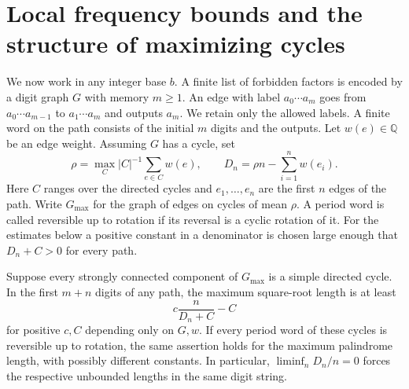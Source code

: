 \section{Local frequency bounds and the structure of maximizing cycles}
\label{sec:frequency}

We now work in any integer base \(b\). A finite list of forbidden factors is encoded by a digit graph \(G\) with memory \(m\ge1\). An edge with label \(a_0\cdots a_m\) goes from \(a_0\cdots a_{m-1}\) to \(a_1\cdots a_m\) and outputs \(a_m\). We retain only the allowed labels. A finite word on the path consists of the initial \(m\) digits and the outputs. Let \(w(e)\in\mathbb Q\) be an edge weight. Assuming \(G\) has a cycle, set
\[
  \rho=\max_C |C|^{-1}\sum_{e\in C} w(e),\qquad
  D_n=\rho n-\sum_{i=1}^{n}w(e_i).
\]
Here \(C\) ranges over the directed cycles and \(e_1,\ldots,e_n\) are the first \(n\) edges of the path. Write \(G_{\max}\) for the graph of edges on cycles of mean \(\rho\). A period word is called reversible up to rotation if its reversal is a cyclic rotation of it. For the estimates below a positive constant in a denominator is chosen large enough that \(D_n+C>0\) for every path.

\begin{theorem}\label{thm:extreme-frequency}
Suppose every strongly connected component of \(G_{\max}\) is a simple directed cycle. In the first \(m+n\) digits of any path, the maximum square-root length is at least
\[
                 c\frac{n}{D_n+C}-C
\]
for positive \(c,C\) depending only on \(G,w\). If every period word of these cycles is reversible up to rotation, the same assertion holds for the maximum palindrome length, with possibly different constants. In particular, \(\liminf_n D_n/n=0\) forces the respective unbounded lengths in the same digit string.
\end{theorem}

